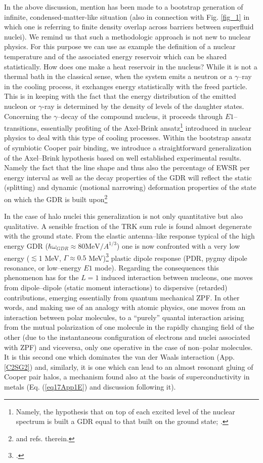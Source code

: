 In the above discussion, mention has been made to a bootstrap generation of infinite, condensed-matter-like situation (also  in connection with Fig. \ref{fig_1} in which one is referring to finite density overlap across barriers between superfluid nuclei). We remind us that such a methodologic approach is not new to nuclear physics. For this purpose we can use as example the definition of a nuclear temperature and of the associated energy reservoir which can be shared statistically. How does one make a heat reservoir in the nucleus? While it is not a thermal bath in the classical sense, when the system emits a neutron or a $\gamma$--ray in the cooling process, it exchanges energy statistically with the freed particle. This is in keeping with the fact that the energy distribution of the emitted nucleon or $\gamma$-ray is determined by the density of levels of the daughter states. Concerning the $\gamma$--decay of the compound nucleus, it proceeds through $E1$--transitions, essentially profiting of the Axel-Brink ansatz\footnote{Namely, the hypothesis that on top of each excited level of the nuclear spectrum is built a GDR equal to that built on the ground state; \cite{Axel:62,Brink:55}.} introduced in nuclear physics to deal with this type of cooling processes.
Within the bootstrap ansatz of symbiotic Cooper pair binding, we introduce a straightforward generalization of the Axel--Brink hypothesis based on  well established experimental    results. Namely the fact that the line shape and thus also the percentage of EWSR per energy interval as well as the decay properties of the GDR will reflect the static (splitting) and dynamic (motional narrowing) deformation properties of the state on which the GDR is built upon\footnote{\cite{LeTourneaux:65,Bohr:75,Bortignon:98} and refs. therein.}

In the case of halo nuclei this generalization is not only quantitative but also qualitative. A sensible fraction of the TRK sum rule is found almost degenerate with the ground state. From the elastic antenna--like response typical of the high energy GDR ($\hbar\omega_{GDR}\approx80\text{MeV}/A^{1/3}$)  one is now confronted with a very low energy ($\lesssim$1 MeV, $\Gamma\approx0.5$ MeV)\footnote{\cite{Kanungo:15}.} plastic dipole response (PDR, pygmy dipole resonance, or low--energy $E1$ mode). Regarding the consequences this phenomenon has for the $L=1$ induced interaction between nucleons, one moves from dipole--dipole (static moment interactions) to dispersive (retarded) contributions, emerging essentially from quantum mechanical ZPF. In other words, and making use of an analogy with atomic physics, one moves from an interaction between polar molecules, to a ``purely'' quantal interaction arising from the mutual polarization of one molecule in the rapidly changing field of the other (due to the instantaneous configuration of electrons and nuclei associated with ZPF) and viceversa, only one operative in the case of non--polar molecules. It is this second one which dominates the van der Waals interaction (App. \ref{C2SG2}) and, similarly, it is one which can lead to an almost resonant gluing of Cooper pair halos, a mechanism found also at the basis of superconductivity in metals (Eq. (\ref{eq17App1E}) and discussion following it).

